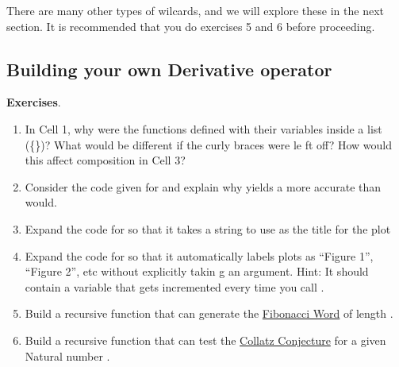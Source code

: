 There are many other types of wilcards, and we will explore these in the next section. It is recommended that you do exercises 5 and 6 before proceeding.

\subsection{Building your own Derivative operator}



\textbf{Exercises}.
\begin{enumerate}
 	   \item In Cell 1, why were the functions defined with their variables inside a list (\{\})? What would be different if the curly braces were le ft off? How would this affect composition in Cell 3?
 	   \item Consider the code given for  and explain why  yields a more accurate  than  would. 
	   \item Expand the code for  so that it takes a string to use as the title for the plot
 	   \item Expand the code for  so that it automatically labels plots as ``Figure 1'', ``Figure 2'', etc without explicitly takin g an argument. Hint: It should contain a variable that gets incremented every time you call . 
	   \item Build a recursive function that can generate the \href{http://en.wikipedia.org/wiki/Fibonacci_word}{Fibonacci Word} of length . 
	   \item Build a recursive function that can test the \href{http://en.wikipedia.org/wiki/Collatz_conjecture}{Collatz Conjecture} for a given Natural number . 
\end{enumerate}
